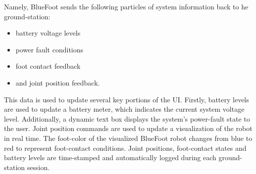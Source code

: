 	Namely, BlueFoot sends the following particles of system information back to he ground-station: 
	\begin{itemize}
		\item battery voltage levels 
		\item power fault conditions 
		\item foot contact feedback
		\item and joint position feedback. 
	\end{itemize}
	This data is used to update several key portions of the UI. Firstly, battery levels are used to update a battery meter, which indicates the current system voltage level. Additionally, a dynamic text box displays the system's power-fault state to the user. Joint position commands are used to update a visualization of the robot in real time. The foot-color of the visualized BlueFoot robot changes from blue to red to represent foot-contact conditions. Joint positions, foot-contact states and battery levels are time-stamped and automatically logged during each ground-station session. 

